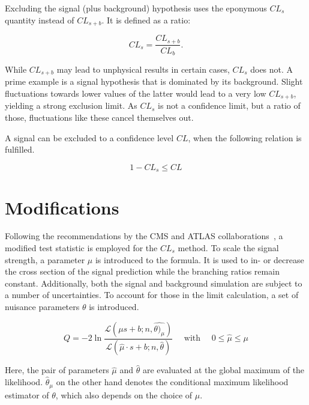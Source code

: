 Excluding the signal (plus background) hypothesis uses the eponymous $CL_s$ quantity instead of $CL_{s+b}$. It is defined as a ratio:

\begin{equation}
  \label{eq:cls}
  CL_s = \frac{CL_{s+b}}{CL_b}.
\end{equation}

\noindent While $CL_{s+b}$ may lead to unphysical results in certain cases, $CL_s$ does not. A prime example is a signal hypothesis that is dominated by its background. Slight fluctuations towards lower values of the latter would lead to a very low $CL_{s+b}$, yielding a strong exclusion limit. As $CL_s$ is not a confidence limit, but a ratio of those, fluctuations like these cancel themselves out.

A signal can be excluded to a confidence level $CL$, when the following relation is fulfilled.

\begin{equation}
  \label{eq:cl-excl}
  1 - CL_s \leq CL
\end{equation}

\section{Modifications}
\label{sec:mods}

Following the recommendations by the CMS and ATLAS collaborations~\cite{clsmod}, a modified test statistic is employed for the $CL_s$ method. To scale the signal strength, a parameter $\mu$ is introduced to the formula. It is used to in- or decrease the cross section of the signal prediction while the branching ratios remain constant. Additionally, both the signal and background simulation are subject to a number of uncertainties. To account for those in the limit calculation, a set of nuisance parameters $\theta$ is introduced.

\begin{equation}
  \label{eq:q-mod}
  Q = - 2 \ln{ \frac{\mathcal{L} (\mu s + b; n, \hat{\theta)_\mu}) }{\mathcal{L} (\hat{\mu} \cdot s + b; n, \hat{\theta} )} } \quad \text{ with } \quad 0 \leq \hat{\mu} \leq \mu
\end{equation}

\noindent Here, the pair of parameters $\hat{\mu}$ and $\hat{\theta}$ are evaluated at the global maximum of the likelihood. $\hat{\theta}_\mu$ on the other hand denotes the conditional maximum likelihood estimator of $\theta$, which also depends on the choice of $\mu$.

